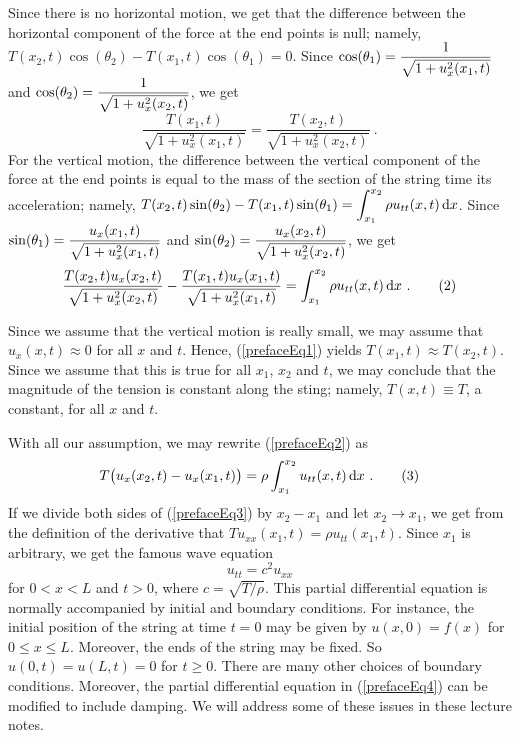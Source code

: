 Since there is no horizontal motion, we get that the difference between
the horizontal component of the force at the end points is null; namely,
$T(x_2,t) \cos(\theta_2) - T(x_1,t) \cos(\theta_1) = 0$.  Since
$\displaystyle \cos(\theta_1) = \frac{1}{\sqrt{1+u_x^2(x_1,t)}}$ and
$\displaystyle \cos(\theta_2) = \frac{1}{\sqrt{1+u_x^2(x_2,t)}}$, we
get
\[
\frac{T(x_1,t)}{\sqrt{1+u_x^2(x_1,t)}}
= \frac{T(x_2,t)}{\sqrt{1+u_x^2(x_2,t)}} \ .  \tag{1} \label{prefaceEq1}
\]
For the vertical motion, the difference between
the vertical component of the force at the end points is equal to the
mass of the section of the string time its acceleration; namely,
$\displaystyle T(x_2,t) \sin(\theta_2) - T(x_1,t) \sin(\theta_1) =
\int_{x_1}^{x_2} \rho u_{tt}(x,t) \,\mathrm{d}{x}$.  Since
$\displaystyle \sin(\theta_1) = \frac{u_x(x_1,t)}{\sqrt{1+u_x^2(x_1,t)}}$ 
and
$\displaystyle \sin(\theta_2) = \frac{u_x(x_2,t)}{\sqrt{1+u_x^2(x_2,t)}}$,
we get
\[
\frac{T(x_2,t) u_x(x_2,t)}{\sqrt{1+u_x^2(x_2,t)}} -
\frac{T(x_1,t) u_x(x_1,t)}{\sqrt{1+u_x^2(x_1,t)}} = 
\int_{x_1}^{x_2} \rho u_{tt}(x,t) \,\mathrm{d}{x} \ . \tag{2}  \label{prefaceEq2}
\]

Since we assume that the vertical motion is really small, we may
assume that $u_x(x,t) \approx 0$ for all $x$ and $t$.  Hence, (\ref{prefaceEq1})
yields $T(x_1,t) \approx T(x_2,t)$.  Since we assume that this is true
for all $x_1$, $x_2$ and $t$, we may conclude that the magnitude of
the tension is constant along the sting; namely, $T(x,t) \equiv T$, a constant,
for all $x$ and $t$.

With all our assumption, we may rewrite (\ref{prefaceEq2}) as
\[
T \big( u_x(x_2,t) - u_x(x_1,t) \big) = \rho \int_{x_1}^{x_2}
u_{tt}(x,t) \,\mathrm{d}{x} \ .  \tag{3}  \label{prefaceEq3}
\]
If we divide both sides of (\ref{prefaceEq3}) by $x_2-x_1$ and let
$x_2 \to x_1$, we get from the definition of the derivative that
$T u_{xx}(x_1,t) = \rho u_{tt}(x_1,t)$.  Since $x_1$ is arbitrary, we
get the famous wave equation
\[
  u_{tt} = c^2 u_{xx} \tag{4}  \label{prefaceEq4}
\]
for $0 < x < L$ and $t > 0$, where $c = \sqrt{T/\rho}$.  This partial
differential equation is normally accompanied by initial and boundary
conditions.  For instance, the initial position of the string at time
$t=0$ may be given by $u(x,0) = f(x)$ for $0 \leq x \leq L$.
Moreover, the ends of the string may be fixed.  So $u(0,t) = u(L,t) = 0$
for $t\geq 0$.  There are many other choices of boundary conditions.
Moreover, the partial differential equation in (\ref{prefaceEq4}) can
be modified to include damping.  We will address some of these issues
in these lecture notes.

